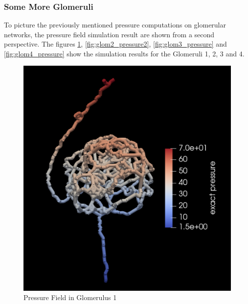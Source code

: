 \subsubsection*{Some More Glomeruli}
\label{SomeMoreGlomeruli}

To picture the previously mentioned pressure computations on glomerular networks, the pressure field simulation result are shown from a second perspective. The figures \ref{fig:glom_pressure2}, \ref{fig:glom2_pressure2}, \ref{fig:glom3_pressure} and \ref{fig:glom4_pressure} show the simulation results for the Glomeruli 1, 2, 3 and 4.

\begin{figure}[h]
\centering
\includegraphics[width=162mm]{glom_pressure2}
\caption{Pressure Field in Glomerulus 1}
\label{fig:glom_pressure2}
\end{figure}
